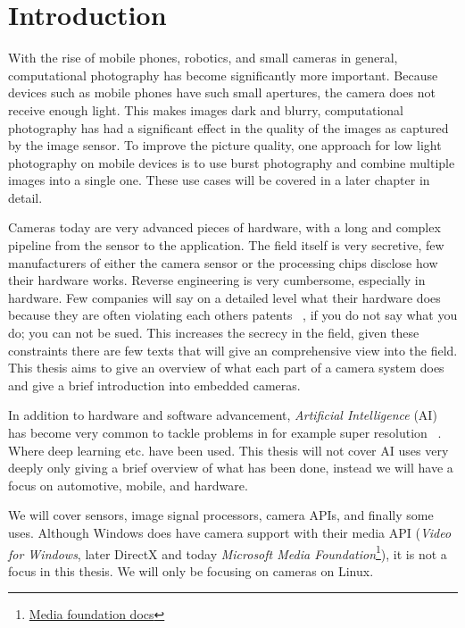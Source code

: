 \chapter{Introduction\label{intro}}
With the rise of mobile phones, robotics, and small cameras in general,
computational photography has become significantly more important. Because
devices such as mobile phones have such small apertures, the camera does not
receive enough light. This makes images dark and blurry, computational
photography has had a significant effect in the quality of the images as
captured by the image sensor. To improve the picture quality, one approach for
low light photography on mobile devices is to use burst photography and combine
multiple images into a single one\cite{burstPhotMobile}. These use cases will
be covered in a later chapter in detail.

Cameras today are very advanced pieces of hardware, with a long and complex
pipeline from the sensor to the application. The field itself is very
secretive, few manufacturers of either the camera sensor or the processing
chips disclose how their hardware works. Reverse engineering is very
cumbersome, especially in hardware. Few companies will say on a detailed level
what their hardware does because they are often violating each others patents~
\cite{experimentalCompPhot}, if you do not say what you do; you can not be
sued. This increases the secrecy in the field, given these constraints there
are few texts that will give an comprehensive view into the field. This thesis
aims to give an overview of what each part of a camera system does and give a
brief introduction into embedded cameras.

In addition to hardware and software advancement, \textit{Artificial Intelligence} (AI)
has become very common to tackle problems in for example super resolution~
\cite{yangDeepLearningSingle2019, delbracio2021mobile}. Where deep
learning etc. have been used. This thesis will not cover AI uses very deeply
only giving a brief overview of what has been done, instead we will have a
focus on automotive, mobile, and hardware.

We will cover sensors, image signal processors, camera APIs, and finally some
uses. Although Windows does have camera support with their media API
(\textit{Video for Windows}, later DirectX and today \textit{Microsoft Media
Foundation}\footnote{\href{https://learn.microsoft.com/en-us/windows/win32/medfound/microsoft-media-foundation-sdk}{Media
foundation docs}}), it is not a focus in this thesis. We will only be focusing
on cameras on Linux.
